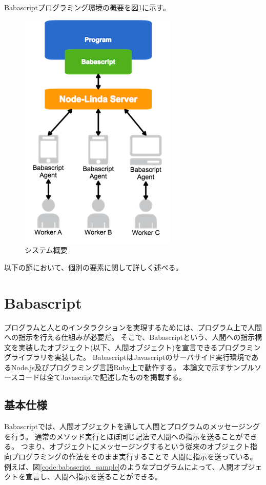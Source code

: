 Babascriptプログラミング環境の概要を図\ref{fig:system_image}に示す。

\begin{figure}[htbp]
  \begin{center}
  \includegraphics[width=.4\linewidth,bb=0 0 397 608]{images/overview.png}
  \end{center}
  \caption{システム概要}
  \label{fig:system_image}
\end{figure}

以下の節において、個別の要素に関して詳しく述べる。

\section{Babascript}\label{babascript}

プログラムと人とのインタラクションを実現するためには、プログラム上で人間への指示を行える仕組みが必要だ。
そこで、Babascriptという、人間への指示構文を実装したオブジェクト(以下、人間オブジェクト)を宣言できるプログラミングライブラリを実装した。
BabascriptはJavascriptのサーバサイド実行環境であるNode.js及びプログラミング言語Ruby上で動作する。
本論文で示すサンプルソースコードは全てJavascriptで記述したものを掲載する。

\subsection{基本仕様}\label{ux57faux672cux4ed5ux69d8}

Babascriptでは、人間オブジェクトを通して人間とプログラムのメッセージングを行う。
通常のメソッド実行とほぼ同じ記法で人間への指示を送ることができる。
つまり、オブジェクトにメッセージングするという従来のオブジェクト指向プログラミングの作法をそのまま実行することで
人間に指示を送っている。
例えば、図\ref{code:babascript_sample}のようなプログラムによって、人間オブジェクトを宣言し、人間へ指示を送ることができる。

